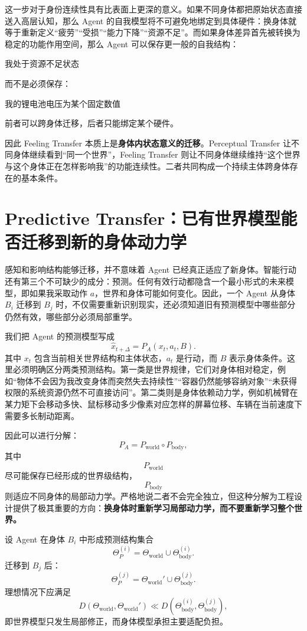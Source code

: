 这一步对于身份连续性具有比表面上更深的意义。如果不同身体都把原始状态直接送入高层认知，那么 Agent 的自我模型将不可避免地绑定到具体硬件：换身体就等于重新定义“疲劳”“受损”“能力下降”“资源不足”。而如果身体差异首先被转换为稳定的功能作用空间，那么 Agent 可以保存更一般的自我结构：
\begin{definition*}
我处于资源不足状态
\end{definition*}
而不是必须保存：
\begin{statementbox}
我的锂电池电压为某个固定数值
\end{statementbox}
前者可以跨身体迁移，后者只能绑定某个硬件。

因此 Feeling Transfer 本质上是\textbf{身体内状态意义的迁移}。Perceptual Transfer 让不同身体继续看到“同一个世界”，Feeling Transfer 则让不同身体继续维持“这个世界与这个身体正在怎样影响我”的功能连续性。二者共同构成一个持续主体跨身体存在的基本条件。


\section{Predictive Transfer：已有世界模型能否迁移到新的身体动力学}

感知和影响结构能够迁移，并不意味着 Agent 已经真正适应了新身体。智能行动还有第三个不可缺少的成分：预测。任何有效行动都隐含一个最小形式的未来模型，即如果我采取动作 $a$，世界和身体可能如何变化。因此，一个 Agent 从身体 $B_i$ 迁移到 $B_j$ 时，不仅需要重新识别现实，还必须知道旧有预测模型中哪些部分仍然有效，哪些部分必须局部重学。

我们把 Agent 的预测模型写成
\[
\hat{x}_{t+\Delta}
=
P_A
\left(
x_t,
a_t,
B
\right).
\]
其中 $x_t$ 包含当前相关世界结构和主体状态，$a_t$ 是行动，而 $B$ 表示身体条件。这里必须明确区分两类预测结构。第一类是世界规律，它们对身体相对稳定，例如“物体不会因为我改变身体而突然失去持续性”“容器仍然能够容纳对象”“未获得权限的系统资源仍然不可直接访问”。第二类则是身体依赖动力学，例如机械臂在某力矩下会移动多快、鼠标移动多少像素对应怎样的屏幕位移、车辆在当前速度下需要多长制动距离。

因此可以进行分解：
\[
P_A
=
P_{\mathrm{world}}
\circ
P_{\mathrm{body}},
\]
其中
\[
P_{\mathrm{world}}
\]
尽可能保存已经形成的世界级结构，
\[
P_{\mathrm{body}}
\]
则适应不同身体的局部动力学。严格地说二者不会完全独立，但这种分解为工程设计提供了极其重要的方向：\textbf{换身体时重新学习局部动力学，而不要重新学习整个世界。}

设 Agent 在身体 $B_i$ 中形成预测结构集合
\[
\Theta_P^{(i)}
=
\Theta_{\mathrm{world}}
\cup
\Theta_{\mathrm{body}}^{(i)}.
\]
迁移到 $B_j$ 后：
\[
\Theta_P^{(j)}
=
\Theta_{\mathrm{world}}'
\cup
\Theta_{\mathrm{body}}^{(j)}.
\]
理想情况下应满足
\[
D
\left(
\Theta_{\mathrm{world}},
\Theta_{\mathrm{world}}'
\right)
\ll
D
\left(
\Theta_{\mathrm{body}}^{(i)},
\Theta_{\mathrm{body}}^{(j)}
\right),
\]
即世界模型只发生局部修正，而身体模型承担主要适配负担。

